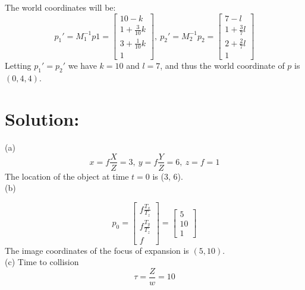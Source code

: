 \documentclass[12pt]{article}
\begin{document}
\noindent The world coordinates will be:
\begin{equation*}
p_1' = M_1^{-1}p1 = \left[ \begin{array}{c}
10 - k\\
1 + \frac{3}{10}k\\
3 + \frac{1}{10}k\\
1
\end{array} \right],\ p_2' = M_2^{-1}p_2 = \left[ \begin{array}{c}
7 - l\\
1 + \frac{3}{7}l\\
2 + \frac{2}{7}l\\
1
\end{array} \right]
\end{equation*}
Letting $p_1' = p_2'$ we have $k = 10$ and $l = 7$, and thus the world coordinate of $p$ is $(0, 4, 4)$.

\section{Solution:}
(a) 
\begin{equation*}
    x = f\frac{X}{Z} = 3, \ y = f\frac{Y}{Z} = 6,\ z = f = 1
\end{equation*}
The location of the object at time $t = 0$ is (3, 6).\\
(b)

\begin{equation*}
    p_0  = \left[ \begin{array}{c}
f\frac{T_x}{T_z}\\
f\frac{T_y}{T_z}\\
f
\end{array} \right] = \left[ \begin{array}{c}
5\\
10\\
1
\end{array} \right] 
\end{equation*}
The image coordinates of the focus of expansion is $(5, 10)$.\\
(c) Time to collision
\begin{equation*}
    \tau = \frac{Z}{w} = 10
\end{equation*}

\end{document}
